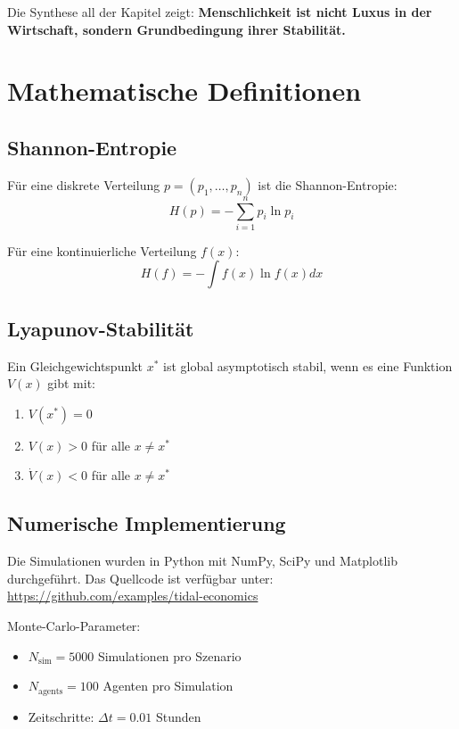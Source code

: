 \documentclass[a4paper, 12pt, twoside, openright]{report}
\theoremstyle{definition}
\theoremstyle{definition}
\begin{document}
Die Synthese all der Kapitel zeigt: \textbf{Menschlichkeit ist nicht Luxus in der Wirtschaft, sondern Grundbedingung ihrer Stabilität.}

\appendix

\chapter{Mathematische Definitionen}

\section{Shannon-Entropie}

Für eine diskrete Verteilung $p = (p_1, \ldots, p_n)$ ist die Shannon-Entropie:
\begin{equation}
    H(p) = -\sum_{i=1}^n p_i \ln p_i
\end{equation}

Für eine kontinuierliche Verteilung $f(x)$:
\begin{equation}
    H(f) = -\int f(x) \ln f(x) dx
\end{equation}

\section{Lyapunov-Stabilität}

Ein Gleichgewichtspunkt $x^*$ ist global asymptotisch stabil, wenn es eine Funktion $V(x)$ gibt mit:
\begin{enumerate}
    \item $V(x^*) = 0$
    \item $V(x) > 0$ für alle $x \neq x^*$
    \item $\dot{V}(x) < 0$ für alle $x \neq x^*$
\end{enumerate}

\section{Numerische Implementierung}

Die Simulationen wurden in Python mit NumPy, SciPy und Matplotlib durchgeführt. Das Quellcode ist verfügbar unter:
\url{https://github.com/examples/tidal-economics}

Monte-Carlo-Parameter:
\begin{itemize}
    \item $N_{\text{sim}} = 5000$ Simulationen pro Szenario
    \item $N_{\text{agents}} = 100$ Agenten pro Simulation
    \item Zeitschritte: $\Delta t = 0.01$ Stunden
\end{itemize}
\end{document}

